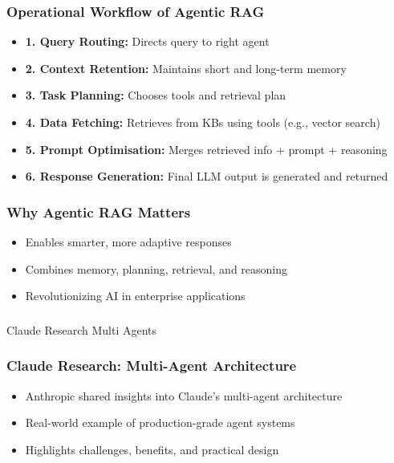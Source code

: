 \begin{frame}[fragile]\frametitle{Operational Workflow of Agentic RAG}
    \begin{itemize}
        \item \textbf{1. Query Routing:} Directs query to right agent
        \item \textbf{2. Context Retention:} Maintains short and long-term memory
        \item \textbf{3. Task Planning:} Chooses tools and retrieval plan
        \item \textbf{4. Data Fetching:} Retrieves from KBs using tools (e.g., vector search)
        \item \textbf{5. Prompt Optimisation:} Merges retrieved info + prompt + reasoning
        \item \textbf{6. Response Generation:} Final LLM output is generated and returned
    \end{itemize}
\end{frame}

\begin{frame}[fragile]\frametitle{Why Agentic RAG Matters}
    \begin{itemize}
        \item Enables smarter, more adaptive responses
        \item Combines memory, planning, retrieval, and reasoning
        \item Revolutionizing AI in enterprise applications
    \end{itemize}
\end{frame}


\begin{frame}[fragile]\frametitle{}
\begin{center}
{\Large Claude Research Multi Agents}
\end{center}
\end{frame}

\begin{frame}[fragile]\frametitle{Claude Research: Multi-Agent Architecture}
    \begin{itemize}
        \item Anthropic shared insights into Claude's multi-agent architecture
        \item Real-world example of production-grade agent systems
        \item Highlights challenges, benefits, and practical design
    \end{itemize}
\end{frame}


